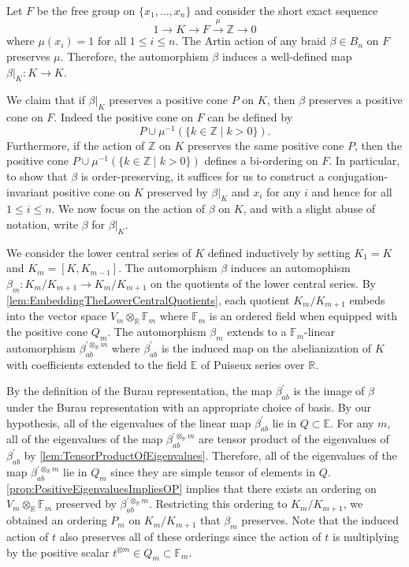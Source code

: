 \documentclass{amsart}
\makeatletter
\renewenvironment{proof}[1][\proofname]{%
   \par\pushQED{\qed}\normalfont%
   \topsep6\p@\@plus6\p@\relax
   \trivlist\item[\hskip\labelsep\bfseries#1\@addpunct{.}]%
   \ignorespaces
}{%
   \popQED\endtrivlist\@endpefalse
}
\makeatother
\begin{document}
\begin{proof}[Proof of \cref{thm:OPViaBurauRep}]
    Let $F$ be the free group on $\{x_1,\dots, x_n\}$ and consider the short exact sequence
    \[
    1 \to K \to F \xrightarrow{\mu} \mathbb{Z} \to 0
    \]
    where $\mu(x_i) = 1$ for all $1\leq i \leq n$. The Artin action of any braid $\beta \in B_n$ on $F$ preserves $\mu.$ Therefore, the automorphism $\beta$ induces a well-defined map $\beta|_K: K \to K$. 

    We claim that if $\beta|_K$ preserves a positive cone $P$ on $K$, then $\beta$ preserves a positive cone on $F$. Indeed the positive cone on $F$ can be defined by 
    \[
    P \cup \mu^{-1}(\{k \in \mathbb{Z} \mid k >0\}). 
    \]
    Furthermore, if the action of $\mathbb{Z}$ on $K$ preserves the same positive cone $P$, then the positive cone $P \cup \mu^{-1}(\{k \in \mathbb{Z} \mid k >0\})$ defines a bi-ordering on $F$. In particular, to show that $\beta$ is order-preserving, it suffices for us to construct a conjugation-invariant positive cone on $K$ preserved by $\beta|_K$ and $x_i$ for any $i$ and hence for all $1 \leq i\leq n$. We now focus on the action of $\beta$ on $K$, and with a slight abuse of notation, write $\beta$ for $\beta|_K$. 
    
    We consider the lower central series of $K$ defined inductively by setting $K_1 = K$ and $K_m = [K,K_{m-1}]$. The automorphism $\beta$ induces an automophism $\beta_m:K_m/K_{m+1} \to K_m/K_{m+1}$ on the quotients of the lower central series. By \cref{lem:EmbeddingTheLowerCentralQuotients}, each quotient $K_m/K_{m+1}$ embeds into the vector space $V_m \otimes_\mathbb{R} \mathbb{F}_m $ where $\mathbb{F}_m$ is an ordered field when equipped with the positive cone $Q_m$. The automorphism $\beta_m$ extends to a $\mathbb{F}_m$-linear automorphism $\beta_{ab}^{'\otimes_\mathbb{R} m}$ where $\beta_{ab}^{'}$ is the induced map on the abelianization of $K$ with coefficients extended to the field $\mathbb{E}$ of Puiseux series over $\mathbb{R}$. 
    
    By the definition of the Burau representation, the map $\beta_{ab}^{'}$ is the image of $\beta$ under the Burau representation with an appropriate choice of basis. By our hypothesis, all of the eigenvalues of the linear map $\beta_{ab}^{'}$ lie in $Q \subset \mathbb{E}$. For any $m$, all of the eigenvalues of the map $\beta_{ab}^{'\otimes_\mathbb{R} m}$ are tensor product of the eigenvalues of $\beta_{ab}^{'}$ by \cref{lem:TensorProductOfEigenvalues}. Therefore, all of the eigenvalues of the map $\beta_{ab}^{'\otimes_\mathbb{R} m}$ lie in $Q_m$ since they are simple tensor of elements in $Q$. \cref{prop:PositiveEigenvaluesImpliesOP} implies that there exists an ordering on $V_m \otimes_\mathbb{R} \mathbb{F}_m$ preserved by $\beta_{ab}^{'\otimes_\mathbb{R} m}$. Restricting this ordering to $K_m/K_{m+1}$, we obtained an ordering $P_m$ on $K_m/K_{m+1}$ that $\beta_m$ preserves. Note that the induced action of $t$ also preserves all of these orderings since the action of $t$ is multiplying by the positive scalar $t^{\otimes m} \in Q_m \subset \mathbb{F}_m$. 


\end{proof}
\end{document}
